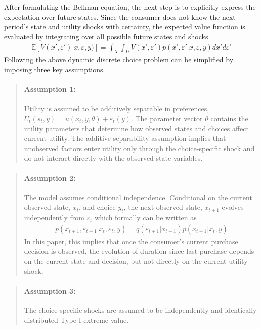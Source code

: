 \\
\\
After formulating the Bellman equation, the next step is to explicitly express the expectation over future states. Since the consumer does not know the next period’s state and utility shocks with certainty, the expected value function is evaluated by integrating over all possible future states and shocks
\begin{align*}
    \mathbb{E}[V(x',\varepsilon') \vert x,\varepsilon,y)] = \int_X \int_\Omega V(x',\varepsilon') p(x',\varepsilon' \vert x,\varepsilon,y)dx'd\varepsilon' \tag{2.2} 
\end{align*}
Following \cite{Rust1987} the above dynamic discrete choice problem can be simplified by imposing three key assumptions. 
\begin{quote}
\paragraph{Assumption 1:} Utility is assumed to be additively separable in preferences, $U_t(s_t,y) = u(x_t,y,\theta) + \varepsilon_t(y)$. The parameter vector $\theta $ contains the utility parameters that determine how observed states and choices affect current utility. The additive separability assumption implies that unobserved factors enter utility only through the choice-specific shock and do not interact directly with the observed state variables.
\end{quote}
\begin{quote}
\paragraph{Assumption 2:} The model assumes conditional independence. Conditional on the current observed state, $x_t$, and choice $y_t$, the next observed state, $x_{t+1}$ evolves independently from $\varepsilon_t$ which formally can be written as 
\begin{align*}
    p(x_{t+1}, \varepsilon_{t+1} \vert x_t,\varepsilon_t,y) = q(\varepsilon_{t+1} \vert x_{t+1}) p(x_{t+1} \vert x_t,y)
\end{align*}
In this paper, this implies that once the consumer’s current purchase decision is observed, the evolution of duration since last purchase depends on the current state and decision, but not directly on the current utility shock.
\end{quote}
\begin{quote}
\paragraph{Assumption 3:} The choice-specific shocks are assumed to be independently and identically distributed Type I extreme value.
\end{quote}
